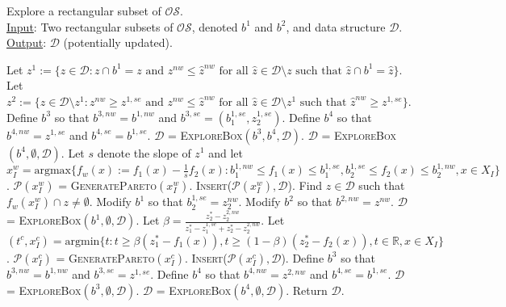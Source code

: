\documentclass[12pt]{article}
\newcommand{\R}{\mathbb{R}}
\newcommand{\OS}{\mathcal{OS}}
\newcommand{\argmin}{\text{argmin}}
\newcommand{\argmax}{\text{argmax}}
\begin{document}
\begin{algorithm}[h!] 
  \small
  \caption{Explore a rectangular subset of $\OS$.\\
  \underline{Input}: Two rectangular subsets of $\OS$, denoted $b^1$ and $b^2$, and data structure $\mathscr{D}$.\\
  \underline{Output}: $\mathscr{D}$ (potentially updated).}
  \label{alg2}
  \begin{algorithmic}[1]
    	\State Let $z^1 := \{z \in \mathscr{D}: z \cap b^1 = z \text{ and } z^{nw} \leq \hat{z}^{nw} \text{ for all } \hat{z} \in \mathscr{D}\setminus z \text{ such that } \hat{z} \cap b^1 = \hat{z}\}$.
    	\State Let $z^2 := \{z \in \mathscr{D} \setminus z^1: z^{nw} \geq z^{1,se} \text{ and } z^{nw} \leq \hat{z}^{nw} \text{ for all } \hat{z} \in \mathscr{D} \setminus{z^1} \text{ such that } \hat{z}^{nw} \geq z^{1,se} \}$.
				\State Define $b^3$ so that $b^{3,nw} = b^{1,nw}$ and $b^{3,se} = (b^{1,se}_1,z^{1,se}_2)$.
				\State Define $b^4$ so that $b^{4,nw} = z^{1,se}$ and $b^{4,se} = b^{1,se}$.		
				\State $\mathscr{D}$ = \textsc{ExploreBox}$(b^3,b^4,\mathscr{D})$.
				\State $\mathscr{D}$ = \textsc{ExploreBox}$(b^4,\emptyset,\mathscr{D})$.
			\Else
				\State Let $s$ denote the slope of $z^1$ and let $x_I^w = \argmax\{f_w(x):= f_1(x)-\frac{1}{s}f_2(x): b^{1,nw}_1 \leq f_1(x) \leq  b^{1,se}_1, b^{1,se}_2 \leq f_2(x) \leq  b^{1,nw}_2, x \in X_I\}$.
				\State $\mathcal{P}({x}^w_I)$ = \textsc{GeneratePareto}$({x}^w_I)$. 
				\State \textsc{Insert}($\mathcal{P}({x}^w_I),\mathscr{D}$).
				\Else
					\State Find $z \in \mathscr{D}$ such that $f_w(x_I^w) \cap z \neq \emptyset$. 
					\State Modify $b^1$ so that $b^{1,se}_2 = z^{nw}_2$.
					\State Modify $b^2$ so that $b^{2,nw} = z^{nw}$.
					\EndIf
					\State $\mathscr{D}$ = \textsc{ExploreBox}$(b^1,\emptyset,\mathscr{D})$.
				\EndIf
			\EndIf
		\Else
			\State Let $\beta = \frac{z^*_2-z^{2,nw}_2}{z^*_1-z^{1,se}_1+z^*_2-z^{2,nw}_2}$.
			\State Let $(t^c,x_I^c) = \argmin\{t: t \geq \beta(z^*_1-f_1(x)), t \geq (1-\beta)(z^*_2-f_2(x)), t \in \R, x \in X_I\}$.
			\State $\mathcal{P}({x}^c_I)$ = \textsc{GeneratePareto}$({x}^c_I)$. 
			\State \textsc{Insert}($\mathcal{P}({x}^c_I),\mathscr{D}$).
				\State Define $b^3$ so that $b^{3,nw} = b^{1,nw}$ and $b^{3,se} = z^{1,se}$.
				\State Define $b^4$ so that $b^{4,nw} = z^{2,nw}$ and $b^{4,se} = b^{1,se}$.		
				\State $\mathscr{D}$ = \textsc{ExploreBox}$(b^3,\emptyset,\mathscr{D})$.
				\State $\mathscr{D}$ = \textsc{ExploreBox}$(b^4,\emptyset,\mathscr{D})$.
			\EndIf
		\EndIf
		\State Return $\mathscr{D}$.
    \EndFunction
  \end{algorithmic}
\end{algorithm} 
\end{document}
